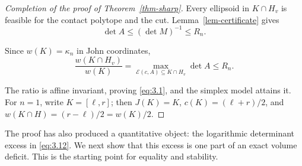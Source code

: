 \begin{proof}[Completion of the proof of Theorem~\ref{thm-sharp}]
Every ellipsoid in $K\cap H_v$ is feasible for the contact polytope and the cut. Lemma~\ref{lem-certificate} gives
\begin{equation}\label{eq:3.17}
\det A\le(\det M)^{-1}\le R_n.
\end{equation}

Since $w(K)=\kappa_n$ in John coordinates,
\begin{equation}\label{eq:3.18}
\frac{w(K\cap H_v)}{w(K)}
=\max_{\mathcal E(c,A)\subseteq K\cap H_v}\det A\le R_n.
\end{equation}

The ratio is affine invariant, proving \eqref{eq:3.1}, and the simplex model attains it. For $n=1$, write $K=[\ell,r]$; then $J(K)=K$, $c(K)=(\ell+r)/2$, and $w(K\cap H)=(r-\ell)/2=w(K)/2$. 
\end{proof}

The proof has also produced a quantitative object: the logarithmic determinant excess in \eqref{eq:3.12}. We next show that this excess is one part of an exact volume deficit. This is the starting point for equality and stability.
